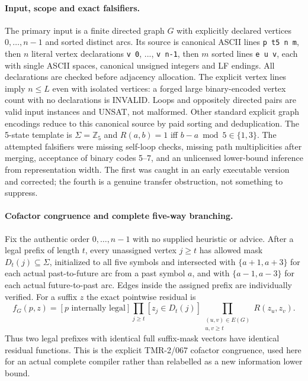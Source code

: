 \documentclass[11pt]{article}
\begin{document}
\paragraph{Input, scope and exact falsifiers.}
The primary input is a finite directed graph $G$ with explicitly declared
vertices $0,\ldots,n-1$ and sorted distinct arcs. Its source is canonical
ASCII lines \texttt{p t5 n m}, then $n$ literal vertex declarations
\texttt{v 0}, ..., \texttt{v n-1}, then $m$ sorted lines
\texttt{e u v}, each with single ASCII spaces, canonical unsigned integers
and LF endings. All declarations are checked before adjacency allocation.
The explicit vertex lines imply $n\le L$ even with isolated vertices:
a forged large binary-encoded vertex count with no declarations is INVALID.
Loops and oppositely directed pairs are valid input instances and UNSAT,
not malformed. Other standard explicit graph encodings reduce to this
canonical source by paid sorting and deduplication. The 5-state template is
$\Sigma=\mathbb Z_5$ and $R(a,b)=1$ iff $b-a\bmod5\in\{1,3\}$.
The attempted falsifiers were missing self-loop checks, missing path
multiplicities after merging, acceptance of binary codes 5--7, and an
unlicensed lower-bound inference from representation width. The first
was caught in an early executable version and corrected; the fourth
is a genuine transfer obstruction, not something to suppress.

\paragraph{Cofactor congruence and complete five-way branching.}
Fix the authentic order $0,\ldots,n-1$ with no supplied heuristic or
advice. After a legal prefix of length $t$, every unassigned vertex
$j\ge t$ has allowed mask $D_t(j)\subseteq\Sigma$, initialized to all
five symbols and intersected with $\{a+1,a+3\}$ for each actual
past-to-future arc from a past symbol $a$, and with
$\{a-1,a-3\}$ for each actual future-to-past arc. Edges inside the
assigned prefix are individually verified. For a suffix $z$ the exact
pointwise residual is
\[
 f_G(p,z)= [p\text{ internally legal}]
 \prod_{j\ge t}[z_j\in D_t(j)]
 \prod_{\substack{(u,v)\in E(G)\\u,v\ge t}} R(z_u,z_v).
\]
Thus two legal prefixes with identical full suffix-mask vectors have
identical residual functions. This is the explicit TMR-2/067 cofactor
congruence, used here for an actual complete compiler rather than
relabelled as a new information lower bound.
\end{document}
